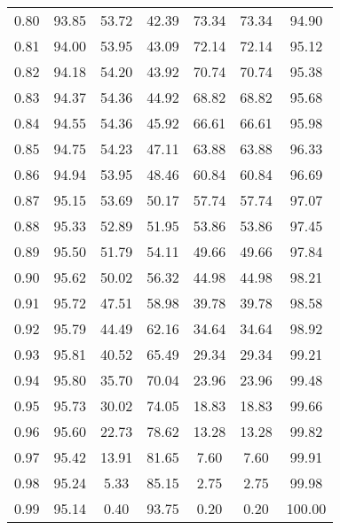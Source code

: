 \begin{tabular}{|c|c|c|c|c|c|c|}
      0.80 &     93.85 &     53.72 &      42.39 &   73.34 &      73.34 &         94.90 \\
      0.81 &     94.00 &     53.95 &      43.09 &   72.14 &      72.14 &         95.12 \\
      0.82 &     94.18 &     54.20 &      43.92 &   70.74 &      70.74 &         95.38 \\
      0.83 &     94.37 &     54.36 &      44.92 &   68.82 &      68.82 &         95.68 \\
      0.84 &     94.55 &     54.36 &      45.92 &   66.61 &      66.61 &         95.98 \\
      0.85 &     94.75 &     54.23 &      47.11 &   63.88 &      63.88 &         96.33 \\
      0.86 &     94.94 &     53.95 &      48.46 &   60.84 &      60.84 &         96.69 \\
      0.87 &     95.15 &     53.69 &      50.17 &   57.74 &      57.74 &         97.07 \\
      0.88 &     95.33 &     52.89 &      51.95 &   53.86 &      53.86 &         97.45 \\
      0.89 &     95.50 &     51.79 &      54.11 &   49.66 &      49.66 &         97.84 \\
      0.90 &     95.62 &     50.02 &      56.32 &   44.98 &      44.98 &         98.21 \\
      0.91 &     95.72 &     47.51 &      58.98 &   39.78 &      39.78 &         98.58 \\
      0.92 &     95.79 &     44.49 &      62.16 &   34.64 &      34.64 &         98.92 \\
      0.93 &     95.81 &     40.52 &      65.49 &   29.34 &      29.34 &         99.21 \\
      0.94 &     95.80 &     35.70 &      70.04 &   23.96 &      23.96 &         99.48 \\
      0.95 &     95.73 &     30.02 &      74.05 &   18.83 &      18.83 &         99.66 \\
      0.96 &     95.60 &     22.73 &      78.62 &   13.28 &      13.28 &         99.82 \\
      0.97 &     95.42 &     13.91 &      81.65 &    7.60 &       7.60 &         99.91 \\
      0.98 &     95.24 &      5.33 &      85.15 &    2.75 &       2.75 &         99.98 \\
      0.99 &     95.14 &      0.40 &      93.75 &    0.20 &       0.20 &        100.00 \\
\bottomrule
\end{tabular}
